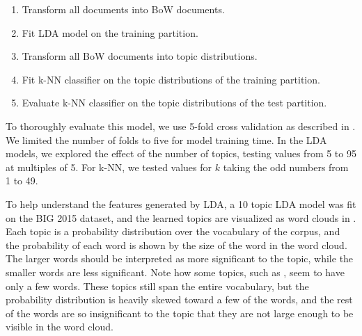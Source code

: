 \documentclass[../stegner_thesis.tex]{subfiles}
\begin{document}
\begin{enumerate}
	\item Transform all documents into BoW documents.
	\item Fit LDA model on the training partition.
	\item Transform all BoW documents into topic distributions.
	\item Fit k-NN classifier on the topic distributions of the training
		partition.
	\item Evaluate k-NN classifier on the topic distributions of the test
		partition.
\end{enumerate}

\par To thoroughly evaluate this model, we use 5-fold cross validation as
described in .
We limited the number of folds to five for model training time.
In the LDA models, we explored the effect of the number of topics, testing
values from 5 to 95 at multiples of 5.
For k-NN, we tested values for $k$ taking the odd numbers from 1 to 49.

\par To help understand the features generated by LDA, a 10 topic LDA model
was fit on the BIG 2015 dataset, and the learned topics are visualized as word
clouds in .
Each topic is a probability distribution over the vocabulary of the corpus,
and the probability of each word is shown by the size of the word in the word
cloud.
The larger words should be interpreted as more significant to the topic, while
the smaller words are less significant.
Note how some topics, such as , seem to have only
a few words.
These topics still span the entire vocabulary, but the probability distribution
is heavily skewed toward a few of the words, and the rest of the words are so
insignificant to the topic that they are not large enough to be visible in the
word cloud.
\end{document}
